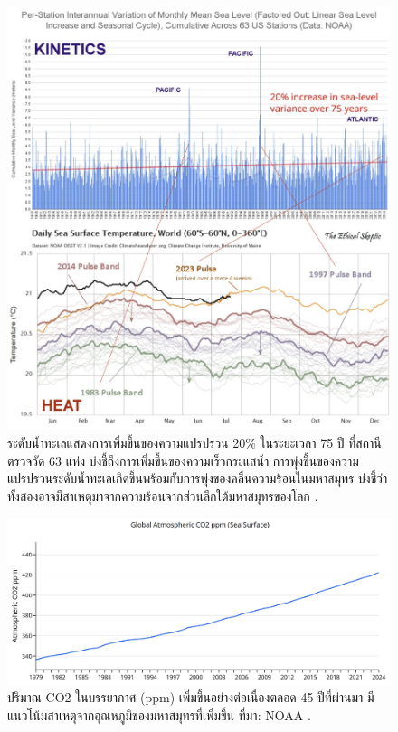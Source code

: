 \documentclass[10pt,twocolumn,letterpaper]{article}
\begin{document}
\begin{figure}[t]
\begin{center}
\includegraphics[width=1\textwidth]{sealevel.jpeg}
\end{center}
   \caption{ระดับน้ำทะเลแสดงการเพิ่มขึ้นของความแปรปรวน 20\% ในระยะเวลา 75 ปี ที่สถานีตรวจวัด  63 แห่ง บ่งชี้ถึงการเพิ่มขึ้นของความเร็วกระแสน้ำ การพุ่งขึ้นของความแปรปรวนระดับน้ำทะเลเกิดขึ้นพร้อมกับการพุ่งของคลื่นความร้อนในมหาสมุทร บ่งชี้ว่าทั้งสองอาจมีสาเหตุมาจากความร้อนจากส่วนลึกใต้มหาสมุทรของโลก \cite{2,129}.}
\label{fig:22}
\end{figure}

\begin{figure}[t]
\begin{center}
\includegraphics[width=1\textwidth]{co2.jpg}
\end{center}
   \caption{ปริมาณ CO2 ในบรรยากาศ (ppm) เพิ่มขึ้นอย่างต่อเนื่องตลอด 45 ปีที่ผ่านมา  มีแนวโน้มสาเหตุจากอุณหภูมิของมหาสมุทรที่เพิ่มขึ้น ที่มา: NOAA \cite{148,129}.}
\label{fig:23}
\end{figure}
\end{document}
